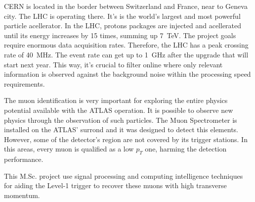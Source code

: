 \begin{foreignabstract}

CERN is located in the border between Switzerland and France, near to Geneva
city. The LHC is operating there. It's is the world's largest and most powerful
particle acellerator. In the LHC, protons packages are injected and acellerated
until its energy increases by 15 times, summing up 7~TeV. The project goals
require enormous data acquisition rates. Therefore, the LHC has a peak crossing
rate of 40~MHz. The event rate can get up to 1~GHz after the upgrade that will
start next year. This way, it's crucial to filter online where only relevant
information is observed against the background noise within the processing speed
requirements.

The muon identification is very important for exploring the entire physics
potential available with the ATLAS operation. It is possible to observe new
physics through the observation of such particles. The Muon Spectrometer is
installed on the ATLAS' surrond and it was designed to detect this elements.
However, some of the detector's region are not covered by its trigger stations.
In this areas, every muon is qualified as a low $p_T$ one, harming the detection
performance.

This M.Sc. project use signal processing and computing intelligence techniques
for aiding the Level-1 trigger to recover these muons with high transverse momentum.

\end{foreignabstract}

